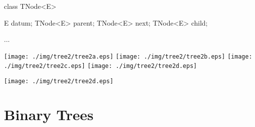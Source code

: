 \documentclass[a4paper, 9pt]{extarticle}
\begin{document}
\begin{blackboard}
class TNode<E> {
    E datum;
    TNode<E> parent;
    TNode<E> next;
    TNode<E> child;

    ...
}
\end{blackboard}

\texttt{[image: ./img/tree2/tree2a.eps]}
\texttt{[image: ./img/tree2/tree2b.eps]}
\texttt{[image: ./img/tree2/tree2c.eps]}
\texttt{[image: ./img/tree2/tree2d.eps]}

\begin{center}
\texttt{[image: ./img/tree2/tree2d.eps]}
\end{center}

\section{Binary Trees}
\end{document}
